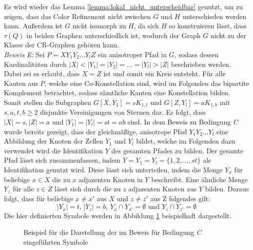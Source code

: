 Es wird wieder das Lemma \ref{lemma:lokal_nicht_unterscheidbar} genutzt, um zu zeigen, dass das Color Refinement nicht zwischen $G$ und $H$ unterschieden werden kann.
Außerdem ist $G$ nicht isomorph zu $H$, da sich $H$ so konstruieren lässt, dass $\tau (Q)$ in beiden Graphen unterschiedlich ist, wodurch der Graph $G$ nicht zu der Klasse der CR-Graphen gehören kann.\\

\emph{Beweis E:} Sei $P=XY_1Y_2...Y_lZ$ ein anisotroper Pfad in $G$, sodass dessen Kardinalitäten durch $|X|<|Y_1|=|Y_2|=...=|Y_l|>|Z|$ beschrieben werden.
Dabei sei es erlaubt, dass $X=Z$ ist und somit ein Kreis entsteht.
Für alle Kanten aus $P$, welche eine Co-Konstellation sind, wird im Folgenden das bipartite Komplement betrachtet, sodass sämtliche Kanten eine Konstellation bilden.
Somit stellen die Subgraphen $G[X,Y_1]=sK_{1,t}$ und $G[Z,Y_l]=aK_{1,b}$ mit $s,a,t,b\geq 2$ disjunkte Vereinigungen von Sternen dar.
Es folgt, dass $|X|=s, |Z|=a$ und $|Y_1|=|Y_l|=st=ab$ sind.
In dem Beweis zu Bedingung \emph{C} wurde bereits gezeigt, dass der gleichmäßige, anisotrope Pfad $Y_1Y_2...Y_l$ eine Abbildung der Knoten der Zellen $Y_1$ und $Y_l$ bildet, welche im Folgenden dazu verwendet wird die Identifikation $Y$ des gesamten Pfades zu bilden.
Der gesamte Pfad lässt sich zusammenfassen, indem $Y=Y_1=Y_l=\{1,2,...,st\}$ als Identifikation genutzt wird.
Diese lässt sich unterteilen, indem die Menge $Y_x$ für beliebige $x\in X$ die zu $x$ adjazenten Knoten in $Y$ beschreibt.
Eine ähnliche Menge $Y_z$ für alle $z\in Z$ lässt sich durch die zu $z$ adjazenten Knoten aus $Y$ bilden.
Daraus folgt, dass für beliebige $x\neq x'$ aus $X$ und $z\neq z'$ aus Z folgendes gilt:
\begin{displaymath}
	|Y_x|=t\text{, }|Y_z|=b\text{, }Y_x\cap Y_{x'}=\emptyset \text{ und }Y_z\cap Y_{z'}=\emptyset
\end{displaymath}
Die hier definierten Symbole werden in Abbildung \ref{fig:hypergraph1} beispielhaft dargestellt.

\begin{figure}[t]
	\centering
	\caption{Beispiel für die Darstellung der im Beweis für Bedingung \emph{C} eingeführten Symbole}
	\label{fig:hypergraph1}
\end{figure}


